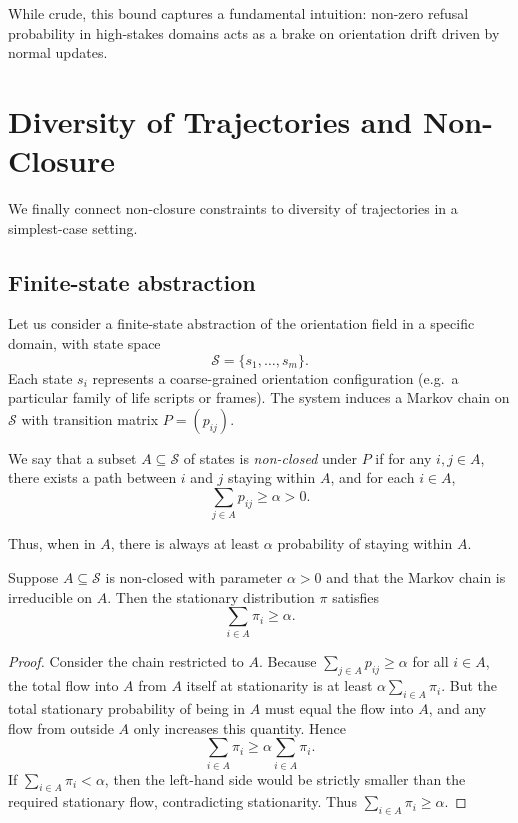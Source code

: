 \documentclass[11pt]{article}
\begin{document}
While crude, this bound captures a fundamental intuition: non-zero refusal probability in high-stakes domains acts as a brake on orientation drift driven by normal updates.

\section{Diversity of Trajectories and Non-Closure}

We finally connect non-closure constraints to diversity of trajectories in a simplest-case setting.

\subsection{Finite-state abstraction}

Let us consider a finite-state abstraction of the orientation field in a specific domain, with state space
\[
\mathcal{S} = \{s_1,\dots,s_m\}.
\]
Each state \(s_i\) represents a coarse-grained orientation configuration (e.g.\ a particular family of life scripts or frames). The system induces a Markov chain on \(\mathcal{S}\) with transition matrix \(P = (p_{ij})\).

\begin{definition}
We say that a subset \(A \subseteq \mathcal{S}\) of states is \emph{non-closed} under \(P\) if for any \(i,j \in A\), there exists a path between \(i\) and \(j\) staying within \(A\), and for each \(i \in A\),
\[
\sum_{j \in A} p_{ij} \ge \alpha > 0.
\]
\end{definition}

Thus, when in \(A\), there is always at least \(\alpha\) probability of staying within \(A\).

\begin{proposition}
Suppose \(A \subseteq \mathcal{S}\) is non-closed with parameter \(\alpha > 0\) and that the Markov chain is irreducible on \(A\). Then the stationary distribution \(\pi\) satisfies
\[
\sum_{i \in A} \pi_i \ge \alpha.
\]
\end{proposition}

\begin{proof}
Consider the chain restricted to \(A\). Because \(\sum_{j \in A} p_{ij} \ge \alpha\) for all \(i \in A\), the total flow into \(A\) from \(A\) itself at stationarity is at least \(\alpha \sum_{i \in A} \pi_i\). But the total stationary probability of being in \(A\) must equal the flow into \(A\), and any flow from outside \(A\) only increases this quantity. Hence
\[
\sum_{i \in A} \pi_i \ge \alpha \sum_{i \in A} \pi_i.
\]
If \(\sum_{i \in A} \pi_i < \alpha\), then the left-hand side would be strictly smaller than the required stationary flow, contradicting stationarity. Thus \(\sum_{i \in A} \pi_i \ge \alpha\).
\end{proof}
\end{document}
